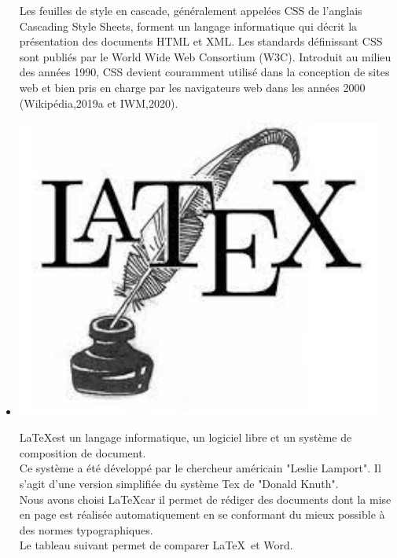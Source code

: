 \begin{itemize}
\begin{minipage}{.10\textwidth}
	\end{minipage}%
Les feuilles de style en cascade, généralement appelées CSS de l'anglais Cascading Style Sheets, forment un langage informatique qui décrit la présentation des documents HTML et XML. Les standards définissant CSS sont publiés par le World Wide Web Consortium (W3C). Introduit au milieu des années 1990, CSS devient couramment utilisé dans la conception de sites web et bien pris en charge par les navigateurs web dans les années 2000 (Wikipédia,2019a et IWM,2020).
 \item \begin{minipage}{.15\textwidth}%
 	\includegraphics[width=0.95\textwidth]{D) IMAGES/latex.jpg}
 \end{minipage}%
\LaTeX est un langage informatique, un logiciel libre et un système de composition de document.\\
Ce système a été développé par le chercheur américain "Leslie Lamport". Il s'agit d'une version simplifiée du système Tex de "Donald Knuth".\\
Nous avons choisi \LaTeX  car il permet de rédiger des documents dont la mise en page est réalisée automatiquement en se conformant du mieux possible à des normes typographiques.\\
Le tableau suivant permet de comparer  \LaTeX~et Word.  


\end{itemize}
